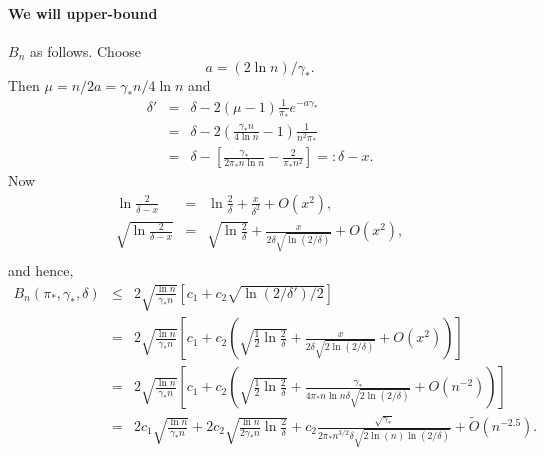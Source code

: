 \documentclass[11pt]{article}
\theoremstyle{plain}
\theoremstyle{definition}
\theoremstyle{remark}
\newcommand{\paren}[1]{\left( #1 \right)}
\newcommand{\sqprn}[1]{\left[ #1 \right]}
\newcommand{\oo}[1]{\frac{1}{#1}}
\newcommand{\beq}{\begin{eqnarray*}}
\newcommand{\eeq}{\end{eqnarray*}}
\begin{document}
\paragraph{We will upper-bound} $B_n$ as follows.
Choose
$$ a=(2\ln n)/\gamma_*.$$
Then
$\mu=n/2a=\gamma_*n/4\ln n$
and
\beq
\delta' &=& \delta-2(\mu-1)\oo{\pi_*}e^{-a \gamma_*} \\
&=& \delta - 2\paren{\frac{\gamma_*n}{4\ln n}-1}\oo{n^2\pi_*} \\
&=&
\delta - \sqprn{
\frac{\gamma_*}{2\pi_*n\ln n}-\frac{2}{\pi_*n^2}
}
=:\delta-x.
\eeq
Now
\beq
\ln\frac{2}{\delta-x} &=& \ln\frac{2}{\delta}+\frac{x}{\delta^2}+O(x^2), \\
\sqrt{\ln\frac{2}{\delta-x}} &=& 
\sqrt{\ln\frac{2}{\delta}}
+
\frac{x}{2\delta\sqrt{\ln(2/\delta)}}+O(x^2), \\
\eeq
and hence,
\beq
B_n(\pi_*,\gamma_*,\delta)
&\le&
2\sqrt{\frac{\ln n}{\gamma_*n}}
\sqprn{
c_1
+ c_2
\sqrt{\ln(2/\delta')/2}
}\\
&=&
2\sqrt{\frac{\ln n}{\gamma_*n}}
\sqprn{
c_1
+ c_2
\paren{
\sqrt{
\oo2
\ln\frac{2}{\delta}}
+
\frac{x}{2\delta\sqrt{2\ln(2/\delta)}}+O(x^2)
}
}\\
&=&
2\sqrt{\frac{\ln n}{\gamma_*n}}
\sqprn{
c_1
+ c_2
\paren{
\sqrt{\oo2\ln\frac{2}{\delta}}
+
\frac{
\gamma_*
}{4{\pi_*n\ln n}\delta\sqrt{2\ln(2/\delta)}}+O(n^{-2})
}
}\\
&=&
2c_1\sqrt{\frac{\ln n}{\gamma_*n}}
+
2c_2\sqrt{\frac{\ln n}{2\gamma_*n}
\ln\frac{2}{\delta}}
+
c_2\frac{\sqrt{\gamma_*}}
{2\pi_* n^{3/2}\delta\sqrt{2\ln(n) \ln(2/\delta)}}
+
\tilde O(n^{-2.5}).
\eeq
\end{document}
